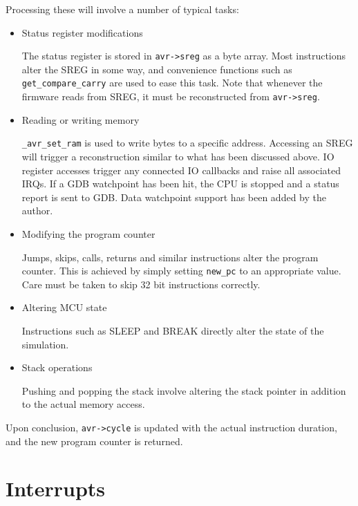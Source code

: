 Processing these will involve a number of typical tasks:

\begin{itemize}
\item Status register modifications

The status register is stored in \lstinline|avr->sreg| as a byte array.
Most instructions alter the \ac{SREG} in some way, and convenience functions such as
\lstinline|get_compare_carry| are used to ease this task. Note that whenever the
firmware reads from \ac{SREG}, it must be reconstructed from \lstinline|avr->sreg|.

\item Reading or writing memory

\lstinline|_avr_set_ram| is used to write bytes to a specific address. Accessing
an \ac{SREG} will trigger a reconstruction similar to what has been discussed above.
\ac{IO} register accesses trigger any connected \ac{IO} callbacks and raise all associated
\acp{IRQ}. If a \ac{GDB} watchpoint has been hit, the \ac{CPU} is stopped and a status report
is sent to \ac{GDB}. Data watchpoint support has been added by the author.

\item Modifying the program counter

Jumps, skips, calls, returns and similar instructions alter the program counter.
This is achieved by simply setting \lstinline|new_pc| to an appropriate value. Care must be
taken to skip 32 bit instructions correctly.

\item Altering \ac{MCU} state

Instructions such as SLEEP and BREAK directly alter the state of the simulation.

\item Stack operations

Pushing and popping the stack involve altering the stack pointer in addition
to the actual memory access. 
\end{itemize}

Upon conclusion, \lstinline|avr->cycle| is updated with the actual instruction
duration, and the new program counter is returned.

\section{Interrupts}

